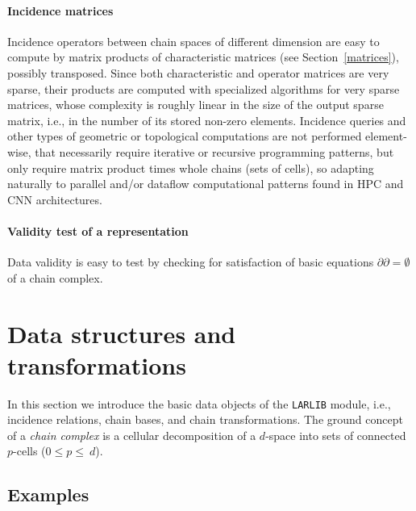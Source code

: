 \paragraph{Incidence matrices}
Incidence operators between chain spaces of different dimension are easy to compute by matrix products of characteristic matrices (see Section~\ref{matrices}), possibly transposed.
Since both characteristic and operator matrices are very sparse, their products are computed with  specialized algorithms for very sparse matrices, whose complexity is roughly linear in the size of the output sparse matrix, i.e., in the number of its stored non-zero elements.
Incidence queries and other types of geometric or topological computations are not performed element-wise, that necessarily require iterative or recursive programming patterns, but only require matrix product times whole chains (sets of cells), so adapting naturally to parallel and/or dataflow computational patterns found in HPC and CNN architectures.

\paragraph{Validity test of a representation}
Data validity is easy to test by checking for satisfaction of basic equations $\partial\partial=\emptyset$ of a chain complex.




\section{Data structures and transformations}
\label{sec:datastructures}



In this section we introduce the basic data objects of the \texttt{LARLIB} module,
i.e., incidence relations, chain bases, and chain transformations. The ground concept of a \emph{chain complex} is a cellular decomposition of a $d$-space into sets of connected $p$-cells ($0\leq p\leq\ d$). 



\subsection{Examples}
\label{sec:examples}


